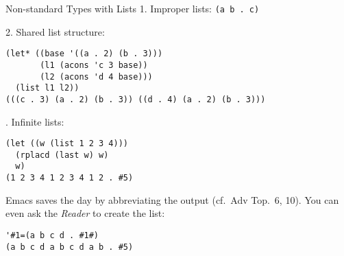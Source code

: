 \documentclass[presentation]{beamer}
\begin{document}
\begin{frame}[fragile]{Non-standard Types with Lists}
1. Improper lists: \texttt{(a b . c)}

2. Shared list structure:
\begin{verbatim}
(let* ((base '((a . 2) (b . 3)))
       (l1 (acons 'c 3 base))
       (l2 (acons 'd 4 base)))
  (list l1 l2))
(((c . 3) (a . 2) (b . 3)) ((d . 4) (a . 2) (b . 3)))
\end{verbatim}

. Infinite lists:
\begin{verbatim}
(let ((w (list 1 2 3 4)))
  (rplacd (last w) w)
  w)
(1 2 3 4 1 2 3 4 1 2 . #5)
\end{verbatim}

Emacs saves the day by abbreviating the output (cf.\ Adv Top.~6, 10).  You can even ask the \emph{Reader} to create the list:
\begin{verbatim}
'#1=(a b c d . #1#)
(a b c d a b c d a b . #5)
\end{verbatim}
\end{frame}
\end{document}
